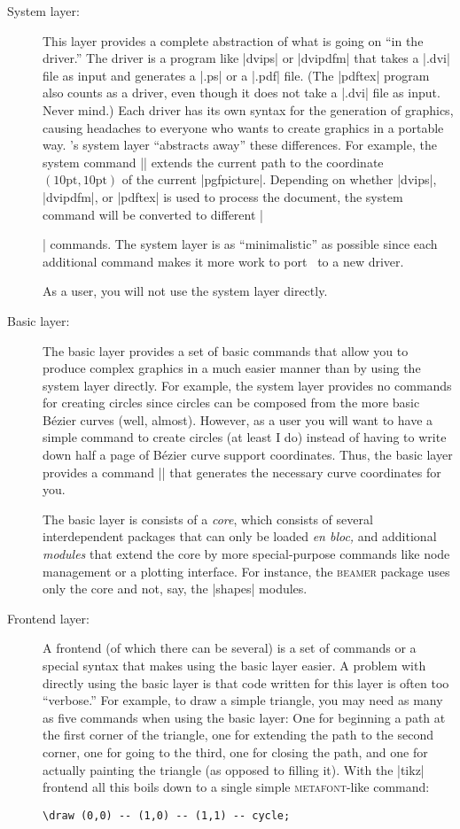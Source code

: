 \begin{description}
\item[System layer:] This layer provides a complete abstraction of what is
  going on ``in the driver.'' The driver is a program like |dvips| or
  |dvipdfm| that takes a |.dvi| file as input and generates a |.ps| or
  a |.pdf| file. (The |pdftex| program also counts as a driver, even
  though it does not take a |.dvi| file as input. Never mind.) Each
  driver has its own syntax for the generation of graphics, causing
  headaches to everyone who wants to create graphics in a portable
  way. \pgfname's system layer ``abstracts away'' these
  differences. For example, the system command
  |\pgfsys@lineto{10pt}{10pt}| extends the current path  to the coordinate
  $(10\mathrm{pt},10\mathrm{pt})$ of the current
  |{pgfpicture}|. Depending on whether |dvips|,
  |dvipdfm|, or |pdftex| is used to process the document, the system
  command will be converted to different |\special| commands.
  The system layer is as ``minimalistic'' as possible since each
  additional command makes it more work to port \pgfname\ to a new
  driver.

  As a user, you will not use the system layer directly.
\item[Basic layer:]
  The basic layer provides a set of basic commands that allow
  you to produce complex graphics in a much easier manner than by using
  the system layer directly. For example,  the system layer provides
  no commands for creating circles since circles can be composed from
  the more basic B\'ezier curves (well, almost). However, as a user you
  will want to have a simple command to create circles
  (at least I do) instead of having to write down half a page of
  B\'ezier curve support coordinates. Thus, the basic layer provides a
  command |\pgfpathcircle| that generates the necessary curve
  coordinates for you.

  The basic layer is consists of a \emph{core}, which consists of
  several interdependent packages that can only be loaded \emph{en
    bloc,} and additional \emph{modules} that extend the core by more
  special-purpose commands like node management or a plotting
  interface. For instance, the \textsc{beamer} package uses only the
  core and not, say, the |shapes| modules.
\item[Frontend layer:]
  A frontend (of which there can be several) is a set of commands
  or a special syntax that makes using the basic layer easier. A
  problem with directly using the basic layer is that code written for
  this layer is often too ``verbose.'' For example, to draw a simple
  triangle, you may need as many as five commands when using the basic
  layer: One for beginning a path at the first corner of the triangle,
  one for extending the path to the second corner, one for going to
  the third, one for closing the path, and one for actually painting
  the triangle (as opposed to filling it). With the |tikz| frontend
  all this boils down to a single simple \textsc{metafont}-like
  command:
\begin{verbatim}
\draw (0,0) -- (1,0) -- (1,1) -- cycle;
\end{verbatim}


\end{description}
